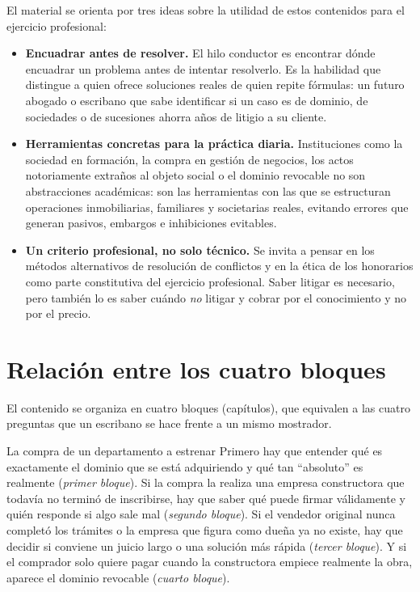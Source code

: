 \documentclass[12pt,oneside]{book}
\begin{document}
El material se orienta por tres ideas sobre la utilidad de estos contenidos para el ejercicio profesional:

\begin{itemize}
    \item \textbf{Encuadrar antes de resolver.} El hilo conductor es encontrar dónde encuadrar un problema antes de intentar resolverlo. Es la habilidad que distingue a quien ofrece soluciones reales de quien repite fórmulas: un futuro abogado o escribano que sabe identificar si un caso es de dominio, de sociedades o de sucesiones ahorra años de litigio a su cliente.
    \item \textbf{Herramientas concretas para la práctica diaria.} Instituciones como la sociedad en formación, la compra en gestión de negocios, los actos notoriamente extraños al objeto social o el dominio revocable no son abstracciones académicas: son las herramientas con las que se estructuran operaciones inmobiliarias, familiares y societarias reales, evitando errores que generan pasivos, embargos e inhibiciones evitables.
    \item \textbf{Un criterio profesional, no solo técnico.} Se invita a pensar en los métodos alternativos de resolución de conflictos y en la ética de los honorarios como parte constitutiva del ejercicio profesional. Saber litigar es necesario, pero también lo es saber cuándo \emph{no} litigar y cobrar por el conocimiento y no por el precio.
\end{itemize}

\section*{Relación entre los cuatro bloques}

El contenido se organiza en cuatro bloques (capítulos), que equivalen a las cuatro preguntas que un escribano se hace frente a un mismo mostrador.

\begin{example}{La compra de un departamento a estrenar}
Primero hay que entender qué es exactamente el dominio que se está adquiriendo y qué tan ``absoluto'' es realmente (\emph{primer bloque}). Si la compra la realiza una empresa constructora que todavía no terminó de inscribirse, hay que saber qué puede firmar válidamente y quién responde si algo sale mal (\emph{segundo bloque}). Si el vendedor original nunca completó los trámites o la empresa que figura como dueña ya no existe, hay que decidir si conviene un juicio largo o una solución más rápida (\emph{tercer bloque}). Y si el comprador solo quiere pagar cuando la constructora empiece realmente la obra, aparece el dominio revocable (\emph{cuarto bloque}).
\end{example}
\end{document}

